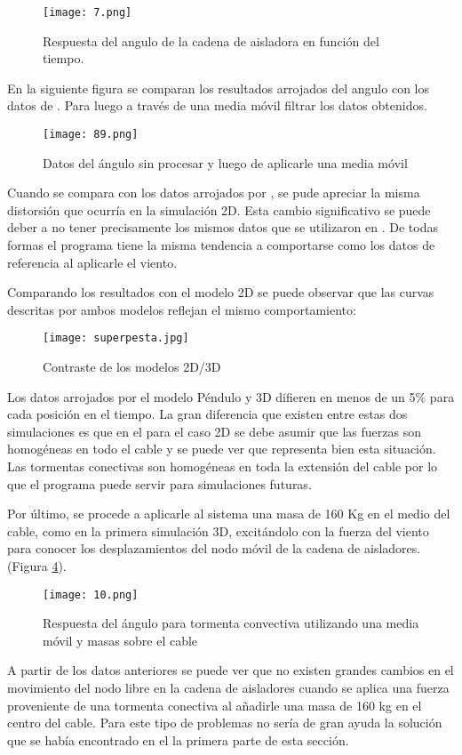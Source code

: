\begin{figure}[h]
	\centering
	\label{anguotiempo3d}
	\texttt{[image: 7.png]}
	\caption{Respuesta del angulo de la cadena de aisladora en función del tiempo.}
\end{figure}


En la siguiente figura se comparan los resultados arrojados del angulo con los datos de \cite{stengel2017measurements}. Para luego a través de una media móvil filtrar los datos obtenidos.


\begin{figure}[h]
	\centering
	\texttt{[image: 89.png]}
	\caption{Datos del ángulo sin procesar y luego de aplicarle una media móvil}
	\label{21}
\end{figure}


Cuando se compara con los datos arrojados por \cite{stengel2017measurements}, se pude apreciar la misma distorsión que ocurría en la simulación 2D. Esta cambio significativo se puede deber a no tener precisamente los mismos datos que se utilizaron en \cite{stengel2017measurements}. De todas formas el programa tiene la misma tendencia a comportarse como los datos de referencia al aplicarle el viento. 

\newpage
Comparando los resultados con el modelo 2D se puede observar que las curvas descritas por ambos modelos reflejan el mismo comportamiento:

\begin{figure}[h]
	\centering
	\texttt{[image: superpesta.jpg]}
	\caption{Contraste de los modelos 2D/3D}
	\label{2dvs3d}
\end{figure}

Los datos arrojados por el modelo Péndulo y 3D difieren en menos de un 5\% para cada posición en el tiempo. La gran diferencia que existen entre estas dos simulaciones es que en el para el caso 2D se debe asumir que las fuerzas son homogéneas en todo el cable y se puede ver que representa bien esta situación.  Las tormentas conectivas son homogéneas en toda la extensión del cable por lo que el programa puede servir para simulaciones futuras.



Por último, se procede a aplicarle al sistema una masa de 160 Kg en el medio del cable, como en la primera simulación 3D, excitándolo con la fuerza del viento para conocer los desplazamientos del nodo móvil de la cadena de aisladores.(Figura \ref{respuestaconmasas}).


\begin{figure}[h]
	\centering
	\texttt{[image: 10.png]}
	\caption{Respuesta del ángulo para tormenta convectiva utilizando una media móvil y masas sobre el cable}
	\label{respuestaconmasas}
\end{figure}

A partir de los datos anteriores se puede ver que no existen grandes cambios en el movimiento del nodo libre en la cadena de aisladores cuando se aplica una fuerza proveniente de una tormenta conectiva al añadirle una masa de 160 kg en el centro del cable. Para este tipo de problemas no sería de gran ayuda la solución que se había encontrado en el la primera parte de esta sección.